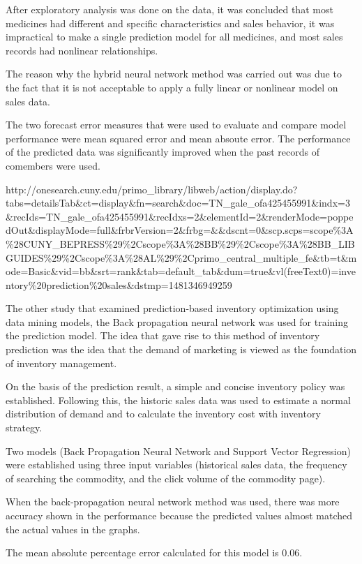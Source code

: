 \documentclass[]{elsarticle} %
\begin{document}
After exploratory analysis was done on the data, it was concluded that
most medicines had different and specific characteristics and sales
behavior, it was impractical to make a single prediction model for all
medicines, and most sales records had nonlinear relationships.

The reason why the hybrid neural network method was carried out was due
to the fact that it is not acceptable to apply a fully linear or
nonlinear model on sales data.

The two forecast error measures that were used to evaluate and compare
model performance were mean squared error and mean absoute error. The
performance of the predicted data was significantly improved when the
past records of comembers were used.

http://onesearch.cuny.edu/primo\_library/libweb/action/display.do?tabs=detailsTab\&ct=display\&fn=search\&doc=TN\_gale\_ofa425455991\&indx=3\&recIds=TN\_gale\_ofa425455991\&recIdxs=2\&elementId=2\&renderMode=poppedOut\&displayMode=full\&frbrVersion=2\&frbg=\&\&dscnt=0\&scp.scps=scope\%3A\%28CUNY\_BEPRESS\%29\%2Cscope\%3A\%28BB\%29\%2Cscope\%3A\%28BB\_LIBGUIDES\%29\%2Cscope\%3A\%28AL\%29\%2Cprimo\_central\_multiple\_fe\&tb=t\&mode=Basic\&vid=bb\&srt=rank\&tab=default\_tab\&dum=true\&vl(freeText0)=inventory\%20prediction\%20sales\&dstmp=1481346949259

The other study that examined prediction-based inventory optimization
using data mining models, the Back propagation neural network was used
for training the prediction model. The idea that gave rise to this
method of inventory prediction was the idea that the demand of marketing
is viewed as the foundation of inventory management.

On the basis of the prediction result, a simple and concise inventory
policy was established. Following this, the historic sales data was used
to estimate a normal distribution of demand and to calculate the
inventory cost with inventory strategy.

Two models (Back Propagation Neural Network and Support Vector
Regression) were established using three input variables (historical
sales data, the frequency of searching the commodity, and the click
volume of the commodity page).

When the back-propagation neural network method was used, there was more
accuracy shown in the performance because the predicted values almost
matched the actual values in the graphs.

The mean absolute percentage error calculated for this model is 0.06.
\end{document}
